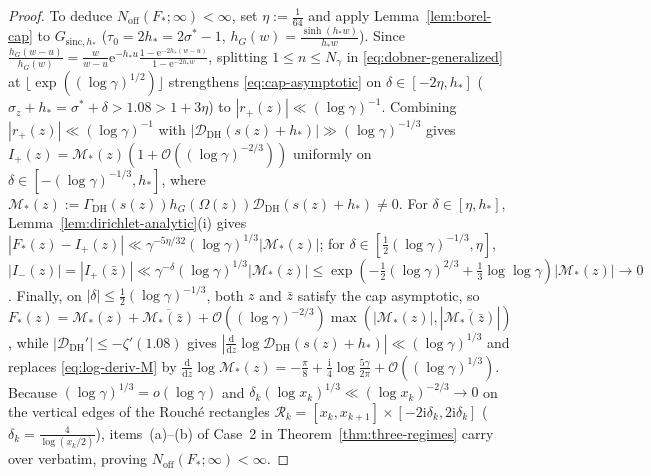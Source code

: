 \documentclass[11pt,a4paper,reqno]{amsart}
\theoremstyle{definition}
\theoremstyle{remark}
\numberwithin{equation}{section}
\newcommand{\dd}{\mathrm{d}}
\newcommand{\ii}{\mathrm{i}}
\newcommand{\ee}{\mathrm{e}}
\begin{document}
\begin{proof}
To deduce $N_{\mathrm{off}}(F_*; \infty) < \infty$, set $\eta := \frac{1}{64}$ and apply Lemma~\ref{lem:borel-cap} to $G_{\mathrm{sinc},h_*}$ ($\tau_0 = 2h_* = 2\sigma^* - 1$, $h_G(w) = \frac{\sinh(h_* w)}{h_* w}$). Since $\frac{h_G(w-u)}{h_G(w)} = \frac{w}{w-u}\ee^{-h_* u}\frac{1-\ee^{-2h_*(w-u)}}{1-\ee^{-2h_* w}}$, splitting $1 \le n \le N_\gamma$ in \eqref{eq:dobner-generalized} at $\lfloor\exp((\log\gamma)^{1/2})\rfloor$ strengthens \eqref{eq:cap-asymptotic} on $\delta \in [-2\eta, h_*]$ ($\sigma_z + h_* = \sigma^* + \delta > 1.08 > 1 + 3\eta$) to $|r_+(z)| \ll (\log\gamma)^{-1}$. Combining $|r_+(z)| \ll (\log\gamma)^{-1}$ with $|\mathcal{D}_{\mathrm{DH}}(s(z)+h_*)| \gg (\log\gamma)^{-1/3}$ gives $I_+(z) = \mathcal{M}_*(z)(1 + \mathcal{O}((\log\gamma)^{-2/3}))$ uniformly on $\delta \in [-(\log\gamma)^{-1/3}, h_*]$, where $\mathcal{M}_*(z) := \Gamma_{\mathrm{DH}}(s(z))h_G(\Omega(z))\mathcal{D}_{\mathrm{DH}}(s(z)+h_*) \ne 0$. For $\delta \in [\eta, h_*]$, Lemma~\ref{lem:dirichlet-analytic}(i) gives $|F_*(z) - I_+(z)| \ll \gamma^{-5\eta/32}(\log\gamma)^{1/3}|\mathcal{M}_*(z)|$; for $\delta \in [\frac{1}{2}(\log\gamma)^{-1/3}, \eta]$, $|I_-(z)| = |I_+(\bar{z})| \ll \gamma^{-\delta}(\log\gamma)^{1/3}|\mathcal{M}_*(z)| \le \exp(-\frac{1}{2}(\log\gamma)^{2/3} + \frac{1}{3}\log\log\gamma)|\mathcal{M}_*(z)| \to 0$. Finally, on $|\delta| \le \frac{1}{2}(\log\gamma)^{-1/3}$, both $z$ and $\bar{z}$ satisfy the cap asymptotic, so $F_*(z) = \mathcal{M}_*(z) + \overline{\mathcal{M}_*(\bar{z})} + \mathcal{O}((\log\gamma)^{-2/3})\max(|\mathcal{M}_*(z)|, |\overline{\mathcal{M}_*(\bar{z})}|)$, while $|\mathcal{D}_{\mathrm{DH}}'|\le -\zeta'(1.08)$ gives $|\frac{\dd}{\dd z}\log\mathcal{D}_{\mathrm{DH}}(s(z)+h_*)| \ll (\log\gamma)^{1/3}$ and replaces \eqref{eq:log-deriv-M} by $\frac{\dd}{\dd z}\log\mathcal{M}_*(z) = -\frac{\pi}{8} + \frac{\ii}{4}\log\frac{5\gamma}{2\pi} + \mathcal{O}((\log\gamma)^{1/3})$. Because $(\log\gamma)^{1/3} = o(\log\gamma)$ and $\delta_k(\log x_k)^{1/3} \ll (\log x_k)^{-2/3} \to 0$ on the vertical edges of the Rouch\'e rectangles $\mathcal{R}_k = [x_k, x_{k+1}] \times [-2\ii\delta_k, 2\ii\delta_k]$ ($\delta_k = \frac{4}{\log(x_k/2)}$), items~(a)--(b) of Case~2 in Theorem~\ref{thm:three-regimes} carry over verbatim, proving $N_{\mathrm{off}}(F_*; \infty) < \infty$.
\end{proof}
\end{document}
